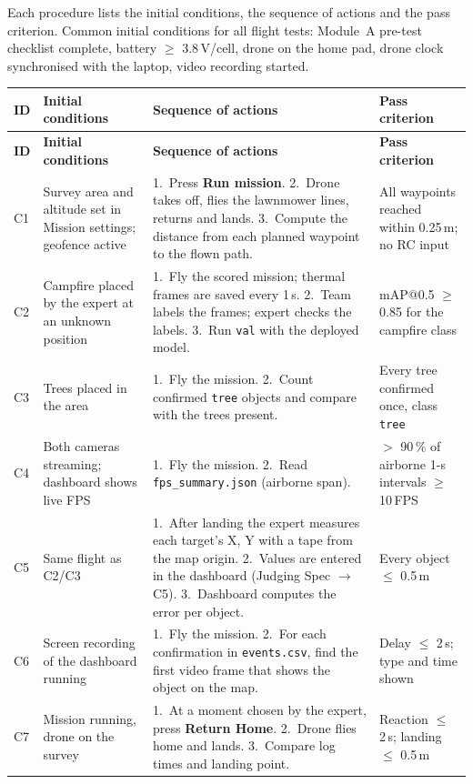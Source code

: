 \documentclass[10pt,a4paper]{article}
\newcommand{\head}[1]{\textbf{#1}}
\newcommand{\file}[1]{\texttt{\small #1}}
\begin{document}
Each procedure lists the initial conditions, the sequence of actions and the pass criterion. Common initial conditions
for all flight tests: Module~A pre-test checklist complete, battery $\ge$ 3.8\,V/cell, drone on the home pad,
drone clock synchronised with the laptop, video recording started.

\begin{longtable}{|L{0.6cm}|L{3.6cm}|L{7.1cm}|L{3.7cm}|}
\hline
{}\head{ID} & \head{Initial conditions} & \head{Sequence of actions} & \head{Pass criterion} \\ \hline
\endfirsthead
\hline
{}\head{ID} & \head{Initial conditions} & \head{Sequence of actions} & \head{Pass criterion} \\ \hline
\endhead
C1 & Survey area and altitude set in Mission settings; geofence active & 1.~Press \textbf{Run mission}. 2.~Drone takes off, flies the lawnmower lines, returns and lands. 3.~Compute the distance from each planned waypoint to the flown path. & All waypoints reached within 0.25\,m; no RC input \\ \hline
C2 & Campfire placed by the expert at an unknown position & 1.~Fly the scored mission; thermal frames are saved every 1\,s. 2.~Team labels the frames; expert checks the labels. 3.~Run \texttt{val} with the deployed model. & mAP@0.5 $\ge$ 0.85 for the campfire class \\ \hline
C3 & Trees placed in the area & 1.~Fly the mission. 2.~Count confirmed \texttt{tree} objects and compare with the trees present. & Every tree confirmed once, class \texttt{tree} \\ \hline
C4 & Both cameras streaming; dashboard shows live FPS & 1.~Fly the mission. 2.~Read \file{fps\_summary.json} (airborne span). & $>$ 90\,\% of airborne 1-s intervals $\ge$ 10\,FPS \\ \hline
C5 & Same flight as C2/C3 & 1.~After landing the expert measures each target's X, Y with a tape from the map origin. 2.~Values are entered in the dashboard (Judging Spec $\rightarrow$ C5). 3.~Dashboard computes the error per object. & Every object $\le$ 0.5\,m \\ \hline
C6 & Screen recording of the dashboard running & 1.~Fly the mission. 2.~For each confirmation in \file{events.csv}, find the first video frame that shows the object on the map. & Delay $\le$ 2\,s; type and time shown \\ \hline
C7 & Mission running, drone on the survey & 1.~At a moment chosen by the expert, press \textbf{Return Home}. 2.~Drone flies home and lands. 3.~Compare log times and landing point. & Reaction $\le$ 2\,s; landing $\le$ 0.5\,m \\ \hline
\end{longtable}
\end{document}
